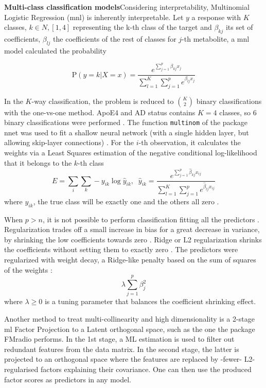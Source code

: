 \documentclass{amsart}
\begin{document}
\leavevmode\newline \textbf{Multi-class classification models}\hspace{.25cm}Considering interpretability, Multinomial Logistic Regression (\acrshort{mnl}) is inherently interpretable. Let $y$ a response with $K$ classes, $k \in N, [1,4]$ representing the k-th class of the target and $\beta_{kj}$ its set of coefficients,  $\beta_{lj}$ the coefficients of the rest of classes for $j$-th metabolite, a \acrlong{mnl} model calculated the probability

\[\textrm{P}(y=k|X=x) =  \dfrac{e^{\sum_{j=1}^{p}\beta_{kj}x_j}}{\sum_{l=1}^{K}\sum_{j=1}^{p}e^{\beta_{lj}x_j}}\]

In the $K$-way classification, the problem is reduced to $\binom{K}{2}$ binary classifications with the one-vs-one method. ApoE4 and AD status contains $K =4$ classes, so 6 binary classifications were performed \cite{James2023AnEdition}. The function \texttt{multinom} of the package \textsf{nnet} was used to fit a shallow neural network (with a single hidden layer, but allowing skip-layer connections) \cite{nnet}. For the $i$-th observation, it calculates the weights via a Least Squares estimation of the negative conditional log-likelihood that it belongs to the $k$-th class
\[E = \sum_{i}\sum_{k}-y_{ik}\log\hat{y}_{ik}, \; \;  \hat{y}_{ik} =  \dfrac{e^{\sum_{j=1}^{p}\hat{\beta}_{kj}x_{ij}}}{\sum_{l=1}^{K}\sum_{j=1}^{p}e^{\hat{\beta}_{lj}x_{ij}}}\]
where $y_{ik}$, the true class will be exactly one and the others all zero \cite{nnet}. 

When $p > n$, it is not possible to perform classification fitting all the predictors \cite{James2023AnEdition}. Regularization trades off a small increase in bias for a great decrease in variance, by shrinking the low coefficients towards zero \cite{James2023AnEdition}. Ridge or L2 regularization \cite{Cessie1992RidgeRegression} shrinks the coefficients without setting them to exactly zero \cite{Cessie1992RidgeRegression}. The predictors were regularized with weight decay, a Ridge-like penalty based on the sum of squares of the weights \cite{nnet}: 
\[\lambda\sum_{j=1}^{p}\beta_j^2 \]where $\lambda \geq 0$ is a tuning parameter that balances the coefficient shrinking effect.

Another method to treat multi-collinearity and high dimensionality is a 2-stage \acrfull{ml} Factor Projection to a Latent orthogonal space, such as the one the package \textsf{FMradio} \cite{Peeters2019StableData} performs. In the 1st stage, a ML estimation is used to filter out redundant features from the data matrix. In the second stage, the latter is projected to an orthogonal space where the features are replaced by -fewer- L2-regularised  factors explaining their covariance. One can then use the produced factor scores as predictors in any model.
\end{document}
